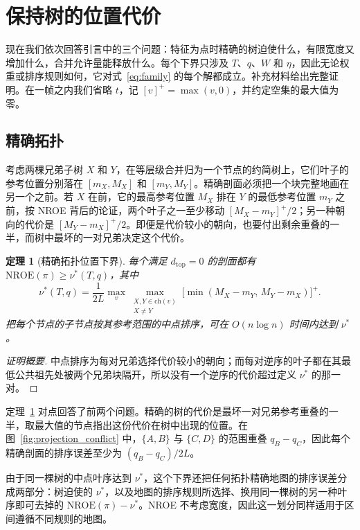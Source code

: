 \documentclass[preprint]{vgtc_zh}   %
\newtheorem{theorem}{定理}
\newcommand{\dtop}{d_{\mathrm{top}}}
\newcommand{\nroe}{\mathrm{NROE}}
\begin{document}
\section{保持树的位置代价}\label{sec:bounds}
现在我们依次回答引言中的三个问题：特征为点时精确的树迫使什么，有限宽度又增加什么，合并允许量能释放什么。每个下界只涉及 $T$、$q$、$W$ 和 $\eta$，因此无论权重或排序规则如何，它对式~\ref{eq:family} 的每个解都成立。补充材料给出完整证明。在一帧之内我们省略 $t$，记 $[v]^+=\max(v,0)$，并约定空集的最大值为零。

\subsection{精确拓扑}
考虑两棵兄弟子树 $X$ 和 $Y$，在等层级合并归为一个节点的约简树上，它们叶子的参考位置分别落在 $[m_X,M_X]$ 和 $[m_Y,M_Y]$。精确剖面必须把一个块完整地画在另一个之前。若 $X$ 在前，它的最高参考位置 $M_X$ 排在 $Y$ 的最低参考位置 $m_Y$ 之前，按 NROE 背后的论证，两个叶子之一至少移动 $[M_X-m_Y]^+/2$；另一种朝向的代价是 $[M_Y-m_X]^+/2$。即便是代价较小的朝向，也要付出剩余重叠的一半，而树中最坏的一对兄弟决定这个代价。
\begin{theorem}[精确拓扑位置下界]\label{thm:order}
每个满足 $\dtop=0$ 的剖面都有 $\nroe(\pi)\ge\nu^*(T,q)$，其中
\begin{equation}\label{eq:nu}
 \nu^*(T,q)=\frac{1}{2L}\max_v\max_{\substack{X,Y\in\mathrm{ch}(v)\\X\ne Y}}
 \bigl[\min(M_X-m_Y,\,M_Y-m_X)\bigr]^+ .
\end{equation}
把每个节点的子节点按其参考范围的中点排序，可在 $O(n\log n)$ 时间内达到 $\nu^*$。
\end{theorem}
\begin{proof}[证明概要]
中点排序为每对兄弟选择代价较小的朝向；而每对逆序的叶子都在其最低公共祖先处被两个兄弟块隔开，所以没有一个逆序的代价超过定义 $\nu^*$ 的那一对。
\end{proof}
定理~\ref{thm:order} 对点回答了前两个问题。精确的树的代价是最坏一对兄弟参考重叠的一半，取最大值的节点指出这份代价在树中出现的位置。在图~\ref{fig:projection_conflict} 中，$\{A,B\}$ 与 $\{C,D\}$ 的范围重叠 $q_B-q_C$，因此每个精确剖面的排序误差至少为 $(q_B-q_C)/2L$。

由于同一棵树的中点叶序达到 $\nu^*$，这个下界还把任何拓扑精确地图的排序误差分成两部分：树迫使的 $\nu^*$，以及地图的排序规则所选择、换用同一棵树的另一种叶序即可去掉的 $\nroe(\pi)-\nu^*$。NROE 不考虑宽度，因此这一划分同样适用于区间遵循不同规则的地图。
\end{document}
